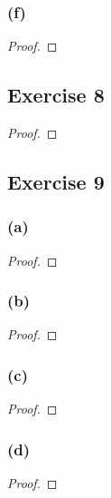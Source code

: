 \documentclass[14pt]{extarticle}
\begin{document}
\subsubsection{(f)}

\begin{proof}

\end{proof}

\subsection{Exercise 8}

\begin{proof}

\end{proof}

\subsection{Exercise 9}

\subsubsection{(a)}

\begin{proof}

\end{proof}

\subsubsection{(b)}

\begin{proof}

\end{proof}

\subsubsection{(c)}

\begin{proof}

\end{proof}

\subsubsection{(d)}

\begin{proof}

\end{proof}
\end{document}
